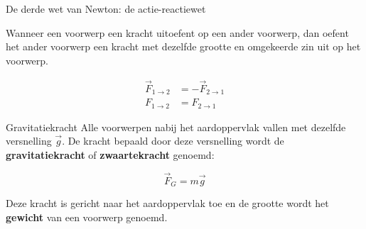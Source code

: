 \begin{lem}{De derde wet van Newton: de actie-reactiewet}

    Wanneer een voorwerp een kracht uitoefent op een ander voorwerp, dan oefent het ander voorwerp een kracht met dezelfde grootte en omgekeerde zin uit op het voorwerp.

        \begin{align*}
            \Vec{F}_{1 \to 2} &= -\Vec{F}_{2 \to 1} \\
        F_{1 \to 2} &= F_{2 \to 1}
        \end{align*}

\end{lem}

\newpage

\begin{theo}[Gravitatiekracht]{Gravitatiekracht}
    Alle voorwerpen nabij het aardoppervlak vallen met dezelfde versnelling $ \Vec{g} $. De kracht bepaald door deze versnelling wordt de \textbf{gravitatiekracht} of \textbf{zwaartekracht} genoemd:

        \begin{equation*}
            \Vec{F}_G = m\Vec{g}
        \end{equation*}

    \noindent Deze kracht is gericht naar het aardoppervlak toe en de grootte wordt het \textbf{gewicht} van een voorwerp genoemd. 

\end{theo}

